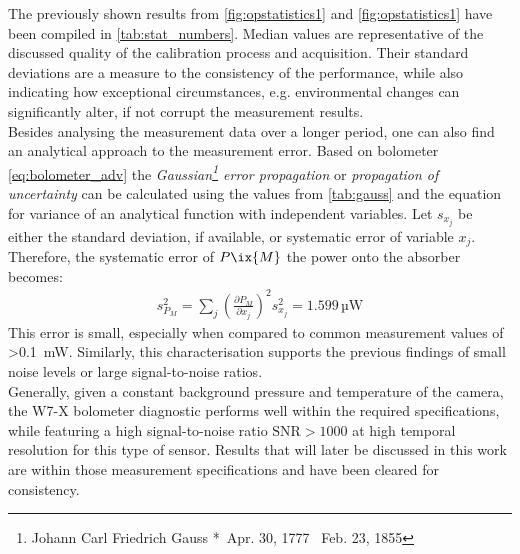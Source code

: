 %
            The previously shown results from \cref{fig:opstatistics1} and \cref{fig:opstatistics1} have been compiled in \cref{tab:stat_numbers}. Median values are representative of the discussed quality of the calibration process and acquisition. Their standard deviations are a measure to the consistency of the performance, while also indicating how exceptional circumstances, e.g. environmental changes can significantly alter, if not corrupt the measurement results.\\%
            Besides analysing the measurement data over a longer period, one can also find an analytical approach to the measurement error. Based on bolometer \cref{eq:bolometer_adv} the \textit{Gaussian\footnote[1]{Johann Carl Friedrich Gauss *~Apr. 30, 1777 \textdagger~Feb. 23, 1855} error propagation} or \textit{propagation of uncertainty} can be calculated using the values from \cref{tab:gauss} and the equation for variance of an analytical function with independent variables. Let $s_{x_{j}}$ be either the standard deviation, if available, or systematic error of variable $x_{j}$. Therefore, the systematic error of $P\ix{M}$ the power onto the absorber becomes:%
%
            \begin{align}%
                s_{P_{M}}^{2}=\sum_{j}\left(\frac{\partial P_{M}}{\partial x_{j}}\right)^{2}s_{x_{j}}^{2}=1.599\,\text{µW}\label{eq:gaussian}%
            \end{align}%
%
            This error is small, especially when compared to common measurement values of >\SI{0.1}{\milli\watt}. Similarly, this characterisation supports the previous findings of small noise levels or large signal-to-noise ratios.\\%
            \newline%
            Generally, given a constant background pressure and temperature of the camera, the W7-X bolometer diagnostic performs well within the required specifications, while featuring a high signal-to-noise ratio $\text{SNR}>1000$ at high temporal resolution for this type of sensor. Results that will later be discussed in this work are within those measurement specifications and have been cleared for consistency.%
%
